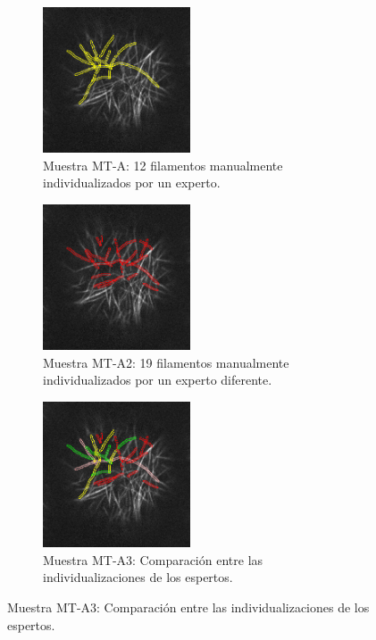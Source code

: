  \begin{figure}[h!]
    \centering
    \begin{subfigure}[t]{0.3\textwidth}
        \centering
        \includegraphics[height=1.7in]{benchImages/SPINNING-DISK-MARCHANTIA-rois-unlabeled.png}
        \caption{Muestra MT-A: 12 filamentos manualmente individualizados por un experto.}
        \label{fig:slice6-spinning-JD-gtruth}
    \end{subfigure}%
    \hspace{0.5cm}
    \begin{subfigure}[t]{0.3\textwidth}
        \centering
        \includegraphics[height=1.7in]{benchImages/Slice6-SPINNING-DISK-MARCHANTIA-1-PL.png}
        \caption{Muestra MT-A2: 19 filamentos manualmente individualizados por un experto diferente.}
        \label{fig:slice6-spinning-PL-gtruth}
    \end{subfigure}
    \hspace{0.5cm}
    \begin{subfigure}[t]{0.3\textwidth}
        \centering
        \includegraphics[height=1.7in]{benchImages/Slice6-SPINNING-ExpertsCompared.png}
        \caption{Muestra MT-A3: Comparaci\'on entre las individualizaciones de los espertos.}

\end{subfigure}
\end{figure}

